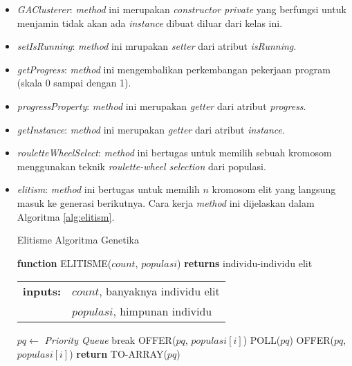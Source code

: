 \begin{itemize}
	\item \textit{GAClusterer}: \textit{method} ini merupakan \textit{constructor private} yang berfungsi untuk menjamin tidak akan ada \textit{instance} dibuat diluar dari kelas ini.
	\item \textit{setIsRunning}: \textit{method} ini mrupakan \textit{setter} dari atribut \textit{isRunning}.
	\item \textit{getProgress}: \textit{method} ini mengembalikan perkembangan pekerjaan program (skala 0 sampai dengan 1).
	\item \textit{progressProperty}: \textit{method} ini merupakan \textit{getter} dari atribut \textit{progress}.
	\item \textit{getInstance}: \textit{method} ini merupakan \textit{getter} dari atribut \textit{instance}.
	\item \textit{rouletteWheelSelect}: \textit{method} ini bertugas untuk memilih sebuah kromosom menggunakan teknik \textit{roulette-wheel selection} dari populasi.
	\item \textit{elitism}: \textit{method} ini bertugas untuk memilih $n$ kromosom elit yang langsung masuk ke generasi berikutnya. Cara kerja \textit{method} ini dijelaskan dalam Algoritma \ref{alg:elitism}.
	
	\begin{algorithm}[H]
	\caption{Elitisme Algoritma Genetika}
	\label{alg:elitism}
	\begin{flushleft}
		\textbf{function} ELITISME($count$, $populasi$) \textbf{returns} individu-individu elit
		\begin{flushleft}
			\begin{tabular}{ l l }
				\textbf{inputs:}& $count$, banyaknya individu elit\\
				& $populasi$, himpunan individu
				\hspace{5pt} 
			\end{tabular} 
		\end{flushleft}
	\end{flushleft}

	\begin{algorithmic}[1]
		\STATE $pq \leftarrow$ \textit{Priority Queue}
		 \label{alg:elitism:ln-2}
			 \label{alg:elitism:ln-3}
				\STATE break \label{alg:elitism:ln-4}
			\ENDIF
			 \label{alg:elitism:ln-6}
				\STATE OFFER($pq$, $populasi[i]$) \label{alg:elitism:ln-7}
			\ELSE
				 \label{alg:elitism:ln-9}
					\STATE POLL($pq$) \label{alg:elitism:ln-10}
					\STATE OFFER($pq$,$populasi[i]$) \label{alg:elitism:ln-11}
				\ENDIF
			\ENDIF
		\ENDFOR
		\STATE \textbf{return} TO-ARRAY($pq$) \label{alg:elitism:ln-15}
	\end{algorithmic}
\end{algorithm}


\end{itemize}
